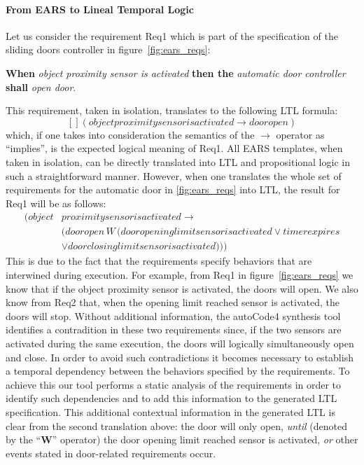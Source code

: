 \paragraph{\textbf{From EARS to Lineal Temporal Logic}\\}
\label{sec:ears_LTL} 
\hspace{-.2cm}
Let us consider the requirement \textsf{Req1} which is part of the
specification of the sliding doors controller in figure~\ref{fig:ears_reqs}:
\begin{center}
\textbf{When} \emph{object proximity sensor is activated} \textbf{then the} \emph{automatic door controller} \textbf{shall}
\emph{open door}.
\end{center}
This requirement, taken in isolation, translates to the following LTL
 formula:
$$[] (objectproximitysensorisactivated \rightarrow dooropen)$$
which, if one takes into consideration the semantics of the $\rightarrow$
operator as ``implies'', is the expected logical meaning of \textsf{Req1}. All
EARS templates, when taken in isolation, can be directly translated into LTL and
propositional logic in such a straightforward manner. However, when one
translates the whole set of requirements for the automatic door in \ref{fig:ears_reqs} into
LTL, the result for \textsf{Req1} will be as follows:
\begin{align*}
[] (object&proximitysensorisactivated \rightarrow\\
 &(dooropen\,W\,(dooropeninglimitsensorisactivated \lor timerexpires\\
 & \lor doorclosinglimitsensorisactivated )))
\end{align*}
This is due to the fact that the requirements specify behaviors that are
interwined during execution. For example, from \textsf{Req1}  in
figure~\ref{fig:ears_reqs} we know that if the \textsf{object proximity sensor}
is activated, the doors will open. We also know from \textsf{Req2} that, when
the \textsf{opening limit reached} sensor is activated, the doors will stop.
Without additional information, the \textsf{autoCode4} synthesis tool identifies
a contradition in these two requirements since, if the two sensors are activated
during the same execution, the doors will logically simultaneously open and
close. In order to avoid such contradictions it becomes necessary to establish a
temporal dependency between the behaviors specified by the requirements. To
achieve this our tool performs a static analysis of the requirements in order to
identify such dependencies and to add this information to the generated LTL
specification. This additional contextual information in the generated LTL is
clear from the second translation above:
the door will only open, \emph{until} (denoted by the ``\textbf{W}'' operator)
the door \textsf{opening limit reached} sensor is activated, \emph{or} other events
stated in door-related requirements occur.\vspace{-.2cm}
